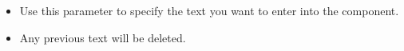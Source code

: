 \begin{itemize}
\item Use this parameter to specify the text you want to enter into the component.
\item Any previous text will be deleted.
\end{itemize}
